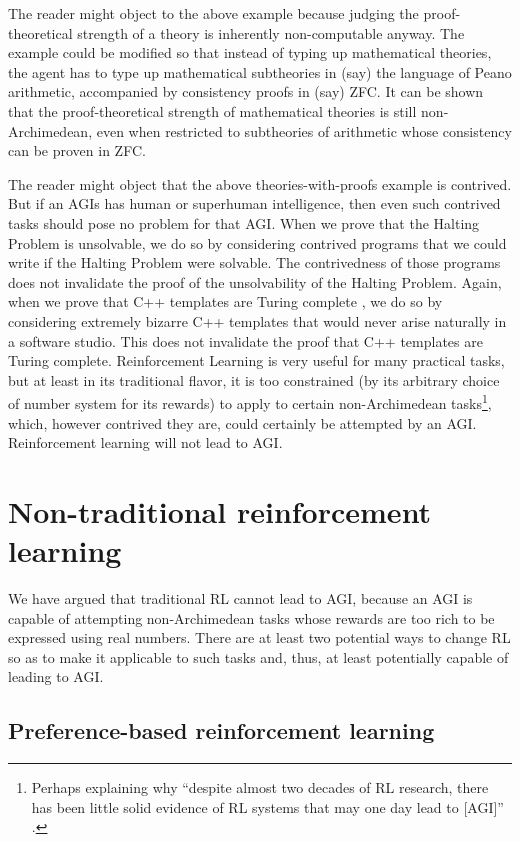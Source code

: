 \documentclass[reqno]{article}
\theoremstyle{definition}
\begin{document}
The reader might object to the above example because judging the proof-theoretical
strength of a theory is inherently non-computable anyway. The example could be
modified so that instead of typing up mathematical theories, the agent has to
type up mathematical subtheories in (say) the language of Peano arithmetic,
accompanied by consistency proofs in (say) ZFC. It can be shown that the
proof-theoretical strength of mathematical theories is still non-Archimedean,
even when restricted to subtheories of arithmetic whose consistency can be
proven in ZFC.

The reader might object that the above theories-with-proofs example is contrived.
But if an AGIs has human or superhuman intelligence, then even such contrived
tasks should pose no problem for that AGI. When we prove that the Halting Problem
is unsolvable, we do so by considering contrived programs that we could write if
the Halting Problem were solvable. The contrivedness of those programs does not
invalidate the proof of the unsolvability of the Halting Problem. Again, when we
prove that C++ templates are Turing complete \cite{veldhuizen}, we do so by
considering extremely
bizarre C++ templates that would never arise naturally in a software
studio. This does not invalidate the proof that C++ templates are Turing complete.
Reinforcement Learning is very useful for many practical tasks, but at least in
its traditional flavor, it is too constrained (by its arbitrary choice of number
system for its rewards) to apply to certain
non-Archimedean tasks\footnote{Perhaps explaining why
``despite almost two decades of RL research, there has been little solid
evidence of RL systems that may one day lead to [AGI]''
\cite{livingston}.}, which, however contrived they are, could certainly be
attempted by an AGI. Reinforcement learning will not lead to AGI.

\section{Non-traditional reinforcement learning}

We have argued that traditional RL cannot lead to AGI, because
an AGI is capable of attempting non-Archimedean tasks whose rewards are
too rich to be expressed using real numbers. There are at least two
potential ways to change RL so as to make it applicable to such tasks and,
thus, at least potentially capable of leading to AGI.

\subsection{Preference-based reinforcement learning}
\end{document}
